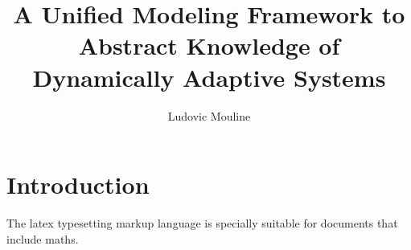 \documentclass[review]{thesis}
\title{A Unified Modeling Framework to Abstract Knowledge of Dynamically Adaptive Systems}
\author{Ludovic Mouline}
\begin{document}
	\frontmatter
	\maketitle
		
	
	\mainmatter
	\chapter{Introduction}
	
	The \gls{latex} typesetting markup language is specially suitable 
for documents that include \gls{maths}.

	\backmatter
	
\end{document}
